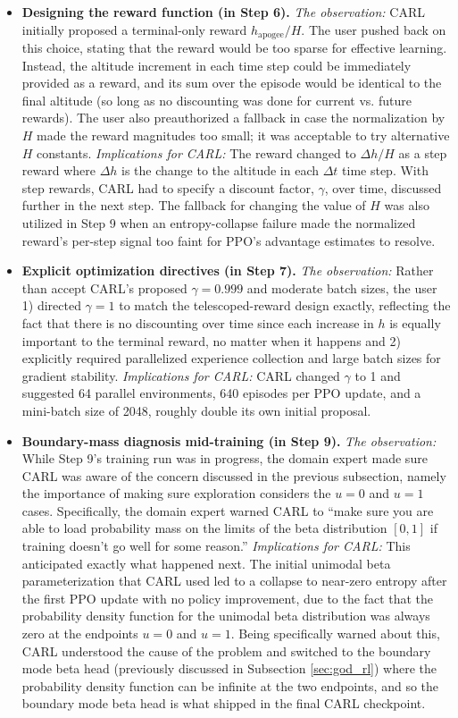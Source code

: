 \documentclass[mnsc,sglanonrev]{informs4}
\begin{document}
\begin{itemize}
\item \textbf{Designing the reward function (in Step 6).}
\emph{The observation: }CARL initially proposed a terminal-only reward $h_{\mathrm{apogee}}/H$. The user pushed back on this choice, stating that the reward would be too sparse for effective learning. Instead, the altitude increment in each time step could be immediately provided as a reward, and its sum over the episode would be identical to the final altitude (so long as no discounting was done for current vs. future rewards). The user also preauthorized a fallback in case the normalization by $H$ made the reward magnitudes too small; it was acceptable to try alternative $H$ constants. \emph{Implications for CARL: }The reward changed to $\Delta h/H$ as a step reward where $\Delta h$ is the change to the altitude in each $\Delta t$ time step. With step rewards, CARL had to specify a discount factor, $\gamma$, over time, discussed further in the next step.  The fallback for changing the value of $H$ was also utilized in Step 9 when an entropy-collapse failure made the normalized reward's per-step signal too faint for PPO's advantage estimates to resolve. 

\item \textbf{Explicit optimization directives (in Step 7).} \emph{The observation:} Rather than accept CARL's proposed $\gamma=0.999$ and moderate batch sizes, the user 1) directed $\gamma=1$ to match the telescoped-reward design exactly, reflecting the fact that there is no discounting over time since each increase in $h$ is equally important to the terminal reward, no matter when it happens and 2) explicitly required parallelized experience collection and large batch sizes for gradient stability. \emph{Implications for CARL: } CARL changed $\gamma$ to 1 and suggested 64 parallel environments, 640 episodes per PPO update, and a mini-batch size of 2048, roughly double its own initial proposal.

\item \textbf{Boundary-mass diagnosis mid-training (in Step 9).} \emph{The observation:} While Step 9's training run was in progress, the domain expert made sure CARL was aware of the concern discussed in the previous subsection, namely the importance of making sure exploration considers the $u=0$ and $u=1$ cases. Specifically, the domain expert warned CARL to ``make sure you are able to load probability mass on the limits of the beta distribution $[0,1]$ if training doesn't go well for some reason.'' \emph{Implications for CARL: } This anticipated exactly what happened next. The initial unimodal beta parameterization that CARL used led to a collapse to near-zero entropy after the first PPO update with no policy improvement, due to the fact that the probability density function for the unimodal beta distribution was always zero at the endpoints $u=0$ and $u=1$. Being specifically warned about this, CARL understood the cause of the problem and switched to the boundary mode beta head (previously discussed in Subsection \ref{sec:god_rl}) where the probability density function can be infinite at the two endpoints, and so the boundary mode beta head is what shipped in the final CARL checkpoint.
\end{itemize}
\end{document}
